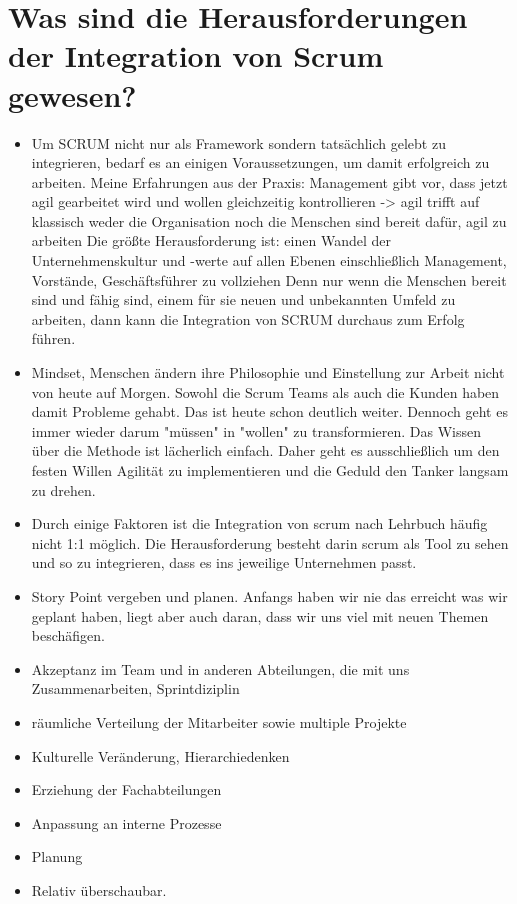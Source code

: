 \section*{Was sind die Herausforderungen der Integration von Scrum gewesen?}
\begin{itemize}
    \item[\openresponse] Um SCRUM nicht nur als Framework sondern tatsächlich gelebt zu integrieren, bedarf es an einigen Voraussetzungen, um damit erfolgreich zu arbeiten. Meine Erfahrungen aus der Praxis: Management gibt vor, dass jetzt agil gearbeitet wird und wollen gleichzeitig kontrollieren -> agil trifft auf klassisch weder die Organisation noch die Menschen sind bereit dafür, agil zu arbeiten Die größte Herausforderung ist: einen Wandel der Unternehmenskultur und -werte auf allen Ebenen einschließlich Management, Vorstände, Geschäftsführer zu vollziehen Denn nur wenn die Menschen bereit sind und fähig sind, einem für sie neuen und unbekannten Umfeld zu arbeiten, dann kann die Integration von SCRUM durchaus zum Erfolg führen.
    \item[\openresponse] Mindset, Menschen ändern ihre Philosophie und Einstellung zur Arbeit nicht von heute auf Morgen. Sowohl die Scrum Teams als auch die Kunden haben damit Probleme gehabt. Das ist heute schon deutlich weiter. Dennoch geht es immer wieder darum "müssen" in "wollen" zu transformieren. Das Wissen über die Methode ist lächerlich einfach. Daher geht es ausschließlich um den festen Willen Agilität zu implementieren und die Geduld den Tanker langsam zu drehen.
    \item[\openresponse] Durch einige Faktoren ist die Integration von scrum nach Lehrbuch häufig nicht 1:1 möglich. Die Herausforderung besteht darin scrum als Tool zu sehen und so zu integrieren, dass es ins jeweilige Unternehmen passt.
    \item[\openresponse] Story Point vergeben und planen. Anfangs haben wir nie das erreicht was wir geplant haben, liegt aber auch daran, dass wir uns viel mit neuen Themen beschäfigen.
    \item[\openresponse] Akzeptanz im Team und in anderen Abteilungen, die mit uns Zusammenarbeiten, Sprintdiziplin
    \item[\openresponse] räumliche Verteilung der Mitarbeiter sowie multiple Projekte
    \item[\openresponse] Kulturelle Veränderung, Hierarchiedenken
    \item[\openresponse] Erziehung der Fachabteilungen
    \item[\openresponse] Anpassung an interne Prozesse
    \item[\openresponse] Planung
    \item[\openresponse] Relativ überschaubar.
\end{itemize}

